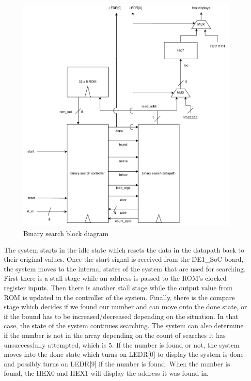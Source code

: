 \documentclass[11pt, titlepage]{article}
\begin{document}
            \begin{figure}[H]
                \centering
                \includegraphics[scale=0.5]{Images/task 2 block diagram.pdf}
                \caption{Binary search block diagram}
            \end{figure}
            
            The system starts in the idle state which resets the data in the datapath back to their original values. Once the start signal is received from the DE1\_SoC board, the system moves to the internal states of the system that are used for searching. First there is a stall stage while an address is passed to the ROM's clocked register inputs. Then there is another stall stage while the output value from ROM is updated in the controller of the system. Finally, there is the compare stage which decides if we found our number and can move onto the done state, or if the bound has to be increased/decreased depending on the situation. In that case, the state of the system continues searching. The system can also determine if the number is not in the array depending on the count of searches it has unsuccessfully attempted, which is 5. If the number is found or not, the system moves into the done state which turns on LEDR[0] to display the system is done and possibly turns on LEDR[9] if the number is found. When the number is found, the HEX0 and HEX1 will display the address it was found in.
\end{document}
